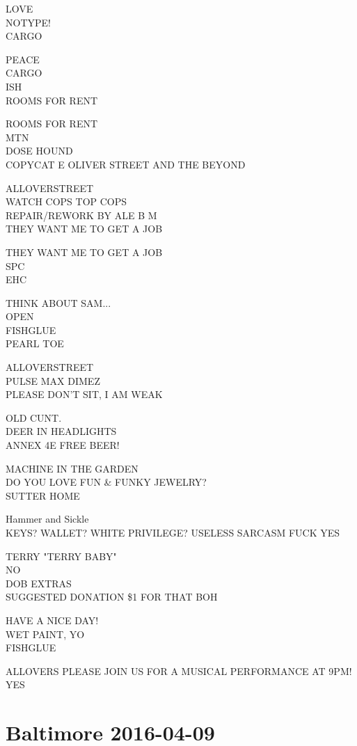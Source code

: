 \documentclass[10pt,letterpaper]{article}
\begin{document}
LOVE\\
NOTYPE!\\
CARGO

PEACE\\
CARGO\\
ISH\\
ROOMS FOR RENT

ROOMS FOR RENT\\
MTN\\
DOSE HOUND\\
COPYCAT E OLIVER STREET AND THE BEYOND

ALLOVERSTREET\\
WATCH COPS TOP COPS\\
REPAIR/REWORK BY ALE B M\\
THEY WANT ME TO GET A JOB

THEY WANT ME TO GET A JOB\\
SPC\\
EHC

THINK ABOUT SAM...\\
OPEN\\
FISHGLUE\\
PEARL TOE

ALLOVERSTREET\\
PULSE MAX DIMEZ\\
PLEASE DON'T SIT, I AM WEAK

OLD CUNT.\\
DEER IN HEADLIGHTS\\
ANNEX 4E FREE BEER!

MACHINE IN THE GARDEN\\
DO YOU LOVE FUN \& FUNKY JEWELRY?\\
SUTTER HOME

Hammer and Sickle\\
KEYS?  WALLET?  WHITE PRIVILEGE?  USELESS SARCASM FUCK YES

TERRY "TERRY BABY"\\
NO\\
DOB EXTRAS\\
SUGGESTED DONATION \$1 FOR THAT BOH

HAVE A NICE DAY!\\
WET PAINT, YO\\
FISHGLUE

ALLOVERS PLEASE JOIN US FOR A MUSICAL PERFORMANCE AT 9PM!\\
YES


\section*{Baltimore 2016-04-09}
\end{document}
